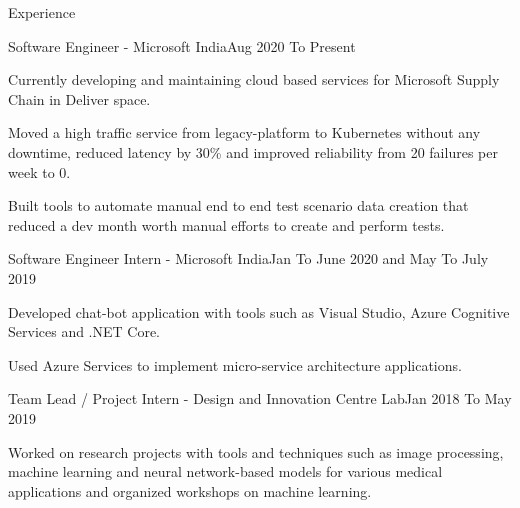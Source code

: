 \documentclass{resume} %
\begin{document}




    \begin{rSection}{Experience}

        \begin{rSubsection}{Software Engineer - Microsoft India}{Aug 2020 To Present}{}{}

            \item Currently developing and maintaining cloud based services for Microsoft Supply Chain in Deliver space.
            \item Moved a high traffic service from legacy-platform to Kubernetes without any downtime, reduced latency by 30\% and improved reliability from 20 failures per week to 0.
            \item Built tools to automate manual end to end test scenario data creation that reduced a dev month worth manual efforts to create and perform tests.
            
        \end{rSubsection}


        \begin{rSubsection}{Software Engineer Intern - Microsoft India}{Jan To June 2020 and May To July 2019}{}{}

            \item Developed chat-bot application with tools such as Visual Studio, Azure Cognitive Services and .NET Core.
            \item Used Azure Services to implement micro-service architecture applications.
            
        \end{rSubsection}


        \begin{rSubsection}{Team Lead / Project Intern - Design and Innovation Centre Lab}{Jan 2018 To May 2019}{}{}

            \item Worked on research projects with tools and techniques such as image processing, machine learning and neural network-based models for various medical applications and organized workshops on machine learning.

        \end{rSubsection}

    \end{rSection}
\end{document}
